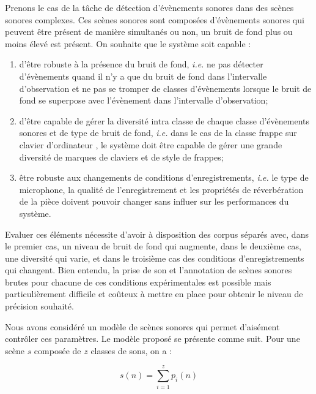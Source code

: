   Prenons le cas de la tâche de détection d'évènements sonores dans des scènes sonores complexes. Ces scènes sonores sont composées d'évènements sonores qui peuvent être présent de manière simultanés ou non, un bruit de fond plus ou moins élevé est présent. On souhaite que le système soit capable :
  \begin{enumerate}
    \item d'être robuste à la présence du bruit de fond, \textit{i.e.} ne pas détecter d'évènements quand il n'y a que du bruit de fond dans l'intervalle d'observation et ne pas se tromper de classes d'évènements lorsque le bruit de fond se superpose avec l'évènement  dans l'intervalle d'observation;
    \item d'être capable de gérer la diversité intra classe de chaque classe d'évènements sonores et de type de bruit de fond,  \textit{i.e.} dans le cas de la classe \og frappe sur clavier d'ordinateur \fg, le système doit être capable de gérer une grande diversité de marques de claviers et de style de frappes;
    \item être robuste aux changements de conditions d'enregistrements,  \textit{i.e.} le type de microphone, la qualité de l'enregistrement et les propriétés de réverbération de la pièce doivent pouvoir changer sans influer sur les performances du système.
  \end{enumerate}

  Evaluer ces éléments nécessite d'avoir à disposition des corpus séparés avec, dans le premier cas, un niveau de bruit de fond qui augmente, dans le deuxième cas, une diversité qui varie, et dans le troisième cas des conditions d'enregistrements qui changent. Bien entendu, la prise de son et l'annotation de scènes sonores brutes pour chacune de ces conditions expérimentales est possible mais particulièrement difficile et coûteux à mettre en place pour obtenir le niveau de précision souhaité.

  Nous avons considéré un modèle de scènes sonores qui permet d'aisément contrôler ces paramètres. Le modèle proposé se présente comme suit. Pour une scène $s$ composée de $z$ classes de sons, on a :

  \begin{equation}
  s(n)=\sum_{i=1}^{z}p_i(n)
  \end{equation}

